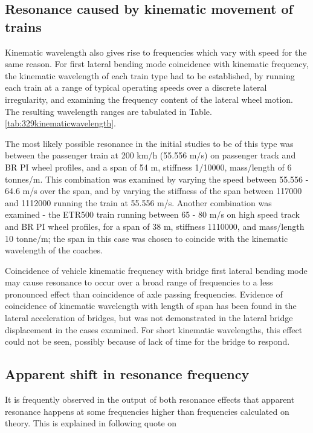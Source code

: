\begin{appendices}
\subsection{Resonance caused by kinematic movement of trains} 
Kinematic wavelength also gives rise to frequencies which vary with speed for the same reason. For first lateral bending mode coincidence with kinematic frequency, the kinematic wavelength of each train type had to be established, by running each train at a range of typical operating speeds over a discrete lateral irregularity, and examining the frequency content of the lateral wheel motion. The resulting wavelength ranges are tabulated in Table.\ref{tab:329kinematicwavelength}. 

The most likely possible resonance in the initial studies to be of this type was between the passenger train at 200 km/h (55.556 m/s) on passenger track and BR PI wheel profiles, and a span of 54 m, stiffness 1/10000, mass/length of 6 tonnes/m. This combination was examined by varying the speed between 55.556 - 64.6 m/s over the span, and by varying the stiffness of the span between 117000 and 1112000 running the train at 55.556 m/s. Another combination was examined - the ETR500 train running between 65 - 80 m/s on high speed track and BR PI wheel profiles, for a span of 38 m, stiffness 1110000, and mass/length 10 tonne/m; the span in this case was chosen to coincide with the kinematic wavelength of the coaches.

Coincidence of vehicle kinematic frequency with bridge first lateral bending mode may cause resonance to occur over a broad range of frequencies to a less pronounced effect than coincidence of axle passing frequencies. Evidence of coincidence of kinematic wavelength with length of span has been found in the lateral acceleration of bridges, but was not demonstrated in the lateral bridge displacement in the cases examined. For short kinematic wavelengths, this effect could not be seen, possibly because of lack of time for the bridge to respond.

\subsection{Apparent shift in resonance frequency}
It is frequently observed in the output of both resonance effects that apparent resonance happens at some frequencies higher than frequencies calculated on theory. This is explained in following quote on \cite[Page 13, Secondary Phase]{d181dt329}


\end{appendices}

